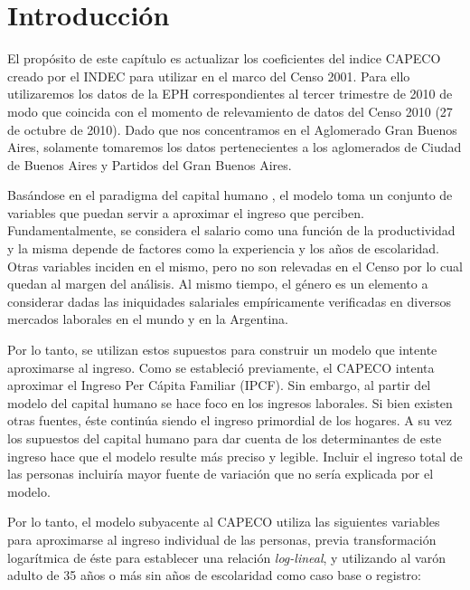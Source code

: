 \section{Introducción}
	

El propósito de este capítulo es actualizar los coeficientes del indice CAPECO creado por el INDEC para utilizar en el marco del Censo 2001. Para ello utilizaremos los datos de la EPH correspondientes al tercer trimestre de 2010 de modo que coincida con el momento de relevamiento de datos del Censo 2010 (27 de octubre de 2010). Dado que nos concentramos en el Aglomerado Gran Buenos Aires, solamente tomaremos los datos pertenecientes a los aglomerados de Ciudad de Buenos Aires y Partidos del Gran Buenos Aires.  

Basándose en el paradigma del capital humano  \cite{mincer,beckar,schultz1961,schultz1962}, el modelo toma un conjunto de variables que puedan servir a aproximar el ingreso que perciben. Fundamentalmente, se considera el salario como una función de la productividad y la misma depende de factores como la experiencia y los años de escolaridad. Otras variables inciden en el mismo, pero no son relevadas en el Censo por lo cual quedan al margen del análisis. Al mismo tiempo, el género es un elemento a considerar dadas las iniquidades salariales empíricamente verificadas en diversos mercados laborales en el mundo y en la Argentina. 

Por lo tanto, se utilizan estos supuestos para construir un modelo que intente aproximarse al ingreso. Como se estableció previamente, el CAPECO intenta aproximar el Ingreso Per Cápita Familiar (IPCF). Sin embargo, al partir del modelo del capital humano se hace foco en los ingresos laborales. Si bien existen otras fuentes, éste continúa siendo el ingreso primordial de los hogares. A su vez los supuestos del capital humano para dar cuenta de los determinantes de este ingreso hace que el modelo resulte más preciso y legible. Incluir el ingreso total de las personas incluiría mayor fuente de variación que no sería explicada por el modelo. 

Por lo tanto, el modelo subyacente al CAPECO utiliza las siguientes variables para aproximarse al ingreso individual de las personas, previa transformación logarítmica de éste para establecer una relación \textit{log-lineal}, y utilizando al varón adulto de 35 años o más sin años de escolaridad como caso base o registro:

